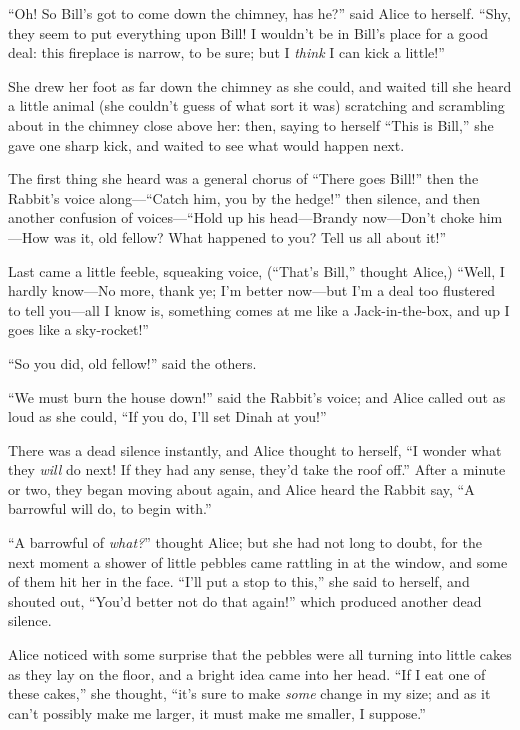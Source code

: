 \documentclass[11pt,openany,oneside]{book}
\begin{document}
“Oh! So Bill’s got to come down the chimney, has he?” said Alice to herself. “Shy, they seem to put everything upon Bill! I wouldn’t be in Bill’s place for a good deal: this fireplace is narrow, to be sure; but I {\em think\/} I can kick a little!” 

She drew her foot as far down the chimney as she could, and waited till she heard a little animal (she couldn’t guess of what sort it was) scratching and scrambling about in the chimney close above her: then, saying to herself “This is Bill,” she gave one sharp kick, and waited to see what would happen next. 

The first thing she heard was a general chorus of “There goes Bill!” then the Rabbit’s voice along—“Catch him, you by the hedge!” then silence, and then another confusion of voices—“Hold up his head—Brandy now—Don’t choke him—How was it, old fellow? What happened to you? Tell us all about it!” 

Last came a little feeble, squeaking voice, (“That’s Bill,” thought Alice,) “Well, I hardly know—No more, thank ye; I’m better now—but I’m a deal too flustered to tell you—all I know is, something comes at me like a Jack-in-the-box, and up I goes like a sky-rocket!” 

“So you did, old fellow!” said the others. 

“We must burn the house down!” said the Rabbit’s voice; and Alice called out as loud as she could, “If you do, I’ll set Dinah at you!” 

There was a dead silence instantly, and Alice thought to herself, “I wonder what they {\em will\/} do next! If they had any sense, they’d take the roof off.” After a minute or two, they began moving about again, and Alice heard the Rabbit say, “A barrowful will do, to begin with.” 

“A barrowful of {\em what?\/}” thought Alice; but she had not long to doubt, for the next moment a shower of little pebbles came rattling in at the window, and some of them hit her in the face. “I’ll put a stop to this,” she said to herself, and shouted out, “You’d better not do that again!” which produced another dead silence. 

Alice noticed with some surprise that the pebbles were all turning into little cakes as they lay on the floor, and a bright idea came into her head. “If I eat one of these cakes,” she thought, “it’s sure to make {\em some\/} change in my size; and as it can’t possibly make me larger, it must make me smaller, I suppose.” 
\end{document}
